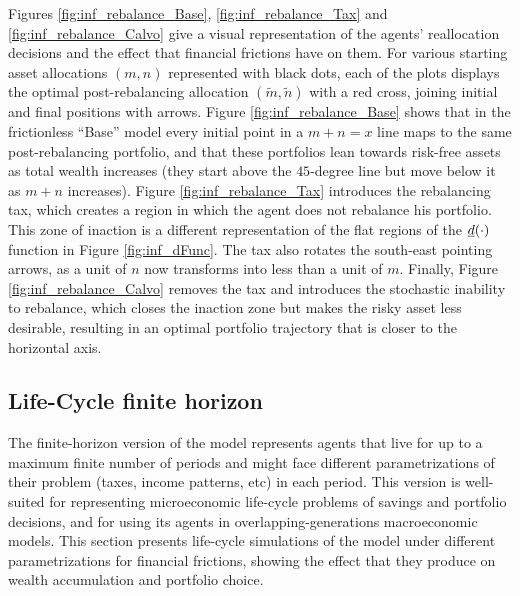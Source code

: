 \documentclass[./RiskyContrib.tex]{subfiles}
\begin{document}
Figures \ref{fig:inf_rebalance_Base}, \ref{fig:inf_rebalance_Tax} and
\ref{fig:inf_rebalance_Calvo} give a visual representation of the agents'
reallocation decisions and the effect that financial frictions have on them.
For various starting asset allocations $(m,n)$ represented with black dots,
each of the plots displays the optimal post-rebalancing allocation
$(\tilde{m},\tilde{n})$  with a red cross, joining initial and final positions
with arrows. Figure \ref{fig:inf_rebalance_Base} shows that in the frictionless
``Base'' model every initial point in a $m+n=x$ line maps to the same post-rebalancing
portfolio, and that these portfolios lean towards risk-free assets as total wealth
increases (they start above the $45$-degree line but move below it as $m+n$ increases).
Figure \ref{fig:inf_rebalance_Tax} introduces the rebalancing tax, which creates
a region in which the agent does not rebalance his portfolio. This zone of
inaction is a different representation of the flat regions of the $\underline{d}(\cdot)$
function in Figure \ref{fig:inf_dFunc}. The tax also rotates the south-east pointing
arrows, as a unit of $n$ now transforms into less than a unit of $m$. Finally,
Figure \ref{fig:inf_rebalance_Calvo} removes the tax and introduces the stochastic
inability to rebalance, which closes the inaction zone but makes the risky asset
less desirable, resulting in an optimal portfolio trajectory that is closer to
the horizontal axis.


\subsection{Life-Cycle finite horizon}

The finite-horizon version of the model represents agents that live for up to
a maximum finite number of periods and might face different parametrizations
of their problem (taxes, income patterns, etc) in each period. This version is
well-suited for representing microeconomic life-cycle problems of savings and
portfolio decisions, and for using its agents in overlapping-generations macroeconomic
models. This section presents life-cycle simulations of the model under different
parametrizations for financial frictions, showing the effect that they produce
on wealth accumulation and portfolio choice.
\end{document}
